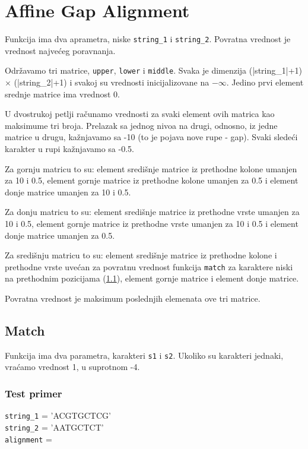 \section{Affine Gap Alignment}

Funkcija ima dva aprametra, niske \texttt{string\_1} i \texttt{string\_2}. Povratna vrednost je vrednost najvećeg poravnanja.

Održavamo tri matrice, \texttt{upper}, \texttt{lower} i \texttt{middle}. Svaka je dimenzija (|string\_1|+1) $\times$ (|string\_2|+1) i svakoj su vrednosti inicijalizovane na $-\infty$. Jedino prvi element srednje matrice ima vrednost 0. 


U dvostrukoj petlji računamo vrednosti za svaki element ovih matrica kao maksimume tri broja. Prelazak sa jednog nivoa na drugi, odnosno, iz jedne matrice u drugu, kažnjavamo sa -10 (to je pojava nove rupe - gap). Svaki sledeći karakter u rupi kažnjavamo sa -0.5. 

Za gornju matricu to su: element središnje matrice iz prethodne kolone umanjen za 10 i 0.5, element gornje matrice iz prethodne kolone umanjen za 0.5 i element donje matrice umanjen za 10 i 0.5. 

Za donju matricu to su: element središnje matrice iz prethodne vrste umanjen za 10 i 0.5, element gornje matrice iz prethodne vrste umanjen za 10 i 0.5 i element donje matrice umanjen za 0.5. 

Za središnju matricu to su: element središnje matrice iz prethodne kolone i prethodne vrste uvećan za povratnu vrednost funkcija \texttt{match} za karaktere niski na prethodnim pozicijama (\ref{match2}), element gornje matrice i element donje matrice. 

Povratna vrednost je maksimum poslednjih elemenata ove tri matrice.



\subsection{Match}
\label{match2}

Funkcija ima dva parametra, karakteri \texttt{s1} i \texttt{s2}. Ukoliko su karakteri jednaki, vraćamo vrednost 1, u suprotnom -4.



\subsubsection{Test primer}

\noindent \texttt{string\_1} = 'ACGTGCTCG'
\\\texttt{string\_2} = 'AATGCTCT'
\\\texttt{alignment} = 

